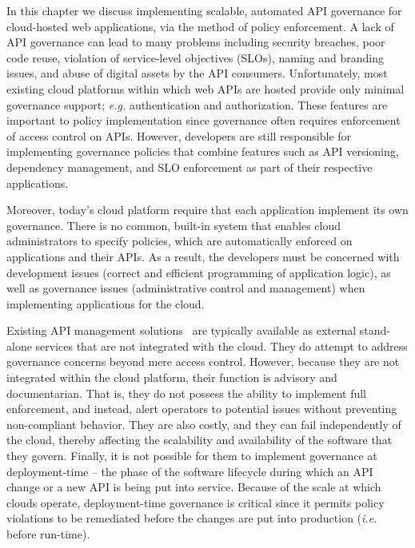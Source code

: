 In this chapter we discuss implementing scalable, automated API governance
for cloud-hosted web applications, via the method of policy enforcement.
A lack of API governance can lead to many problems including security breaches, 
poor code reuse, violation of service-level objectives (SLOs), 
naming and branding issues, and abuse of digital 
assets by the API consumers. Unfortunately, most existing cloud platforms
within which web APIs are hosted provide only minimal governance support; 
{\em e.g.} authentication and authorization.  These features
are important to policy implementation since governance often requires
enforcement of access control on APIs.  
However, developers are still responsible for implementing governance policies
that combine features such as API versioning, 
dependency management, and SLO enforcement as part of their respective
applications.  

Moreover, today's cloud platform require that each application
implement its own governance. There is no common, built-in system that enables
cloud administrators to specify policies, which are automatically enforced on 
applications and their APIs.
As a result, the developers must be concerned with development issues (correct
and efficient programming of application logic), as well as governance issues 
(administrative control and management) when implementing applications for the cloud.

Existing API management solutions~\cite{3scale,apigee,layer7} are typically available as
external stand-alone services that are not integrated with the cloud. They do attempt to
address governance concerns beyond mere access control. However, because they
are not integrated within the cloud platform, their function is
advisory and documentarian.  That is, they 
do not possess the ability to implement full enforcement, and instead, alert
operators to potential issues without preventing non-compliant behavior.
They are also costly, and they can fail independently of the cloud, thereby affecting 
the scalability and availability of the software that they govern.
Finally, it is not possible for them to
implement governance at deployment-time -- the phase of the software lifecycle
during which an API change or a new API is being put into service.
Because of the scale at which clouds operate, deployment-time governance is
critical since it permits policy violations to be remediated before the
changes are put into production ({\em i.e.} before run-time).

